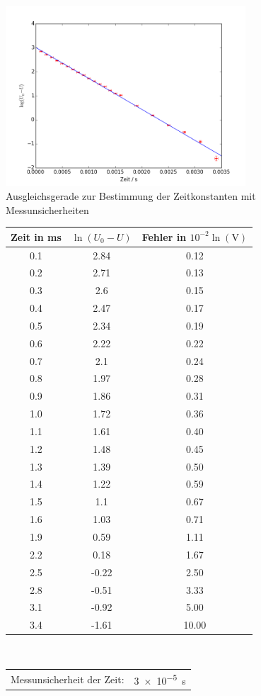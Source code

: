 \begin{figure}[h!]
	\centering
	\includegraphics[width=0.8\textwidth]{Spannung2.png}
	\caption{Ausgleichsgerade zur Bestimmung der Zeitkonstanten mit Messunsicherheiten}
	\label{fig:Spannung2}
\end{figure} 
\begin{figure}[h!]
	\centering
	\begin{tabular}{c|c|c}
		Zeit in \si{\milli\second}& $\ln(U_0-U)$ & Fehler in $10^{-2}\ln(\si{\volt})$ \\
		\hline
		0.1 &  2.84 &  0.12 \\
		0.2 &  2.71 &  0.13 \\
		0.3 &  2.6  &  0.15 \\
		0.4 &  2.47 &  0.17 \\
		0.5 &  2.34 &  0.19 \\
		0.6 &  2.22 &  0.22 \\
		0.7 &  2.1  &  0.24 \\
		0.8 &  1.97 &  0.28 \\
		0.9 &  1.86 &  0.31 \\
		1.0 &  1.72 &  0.36 \\
		1.1 &  1.61 &  0.40  \\
		1.2 &  1.48 &  0.45 \\
		1.3 &  1.39 &  0.50  \\
		1.4 &  1.22 &  0.59 \\
		1.5 &  1.1  &  0.67 \\
		1.6 &  1.03 &  0.71 \\
		1.9 &  0.59 &  1.11 \\
		2.2 &  0.18 &  1.67 \\
		2.5 & -0.22 &  2.50  \\
		2.8 & -0.51 &  3.33 \\
		3.1 & -0.92 &  5.00   \\
		3.4 & -1.61 & 10.00    \\
	\end{tabular}
	\label{tab:aufladekurve}
	\\
	\vspace{1cm}
	\begin{tabular}{ll}
		Messunsicherheit der Zeit: & \SI{3e-5}{\second}
	\end{tabular}
\end{figure}



